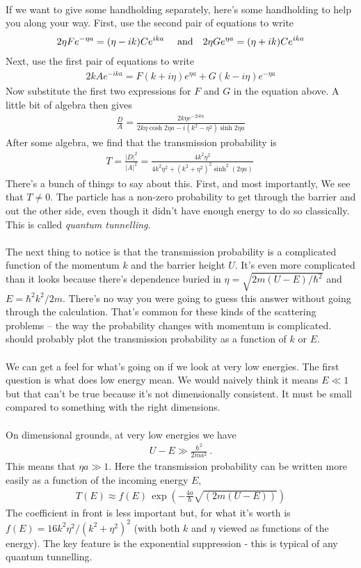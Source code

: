 \documentclass[12pt]{article}
\def\be{\begin{eqnarray}}
\def\ee{\end{eqnarray}}
\newcommand{\nn}{\nonumber}
\newcommand\para{\paragraph{}}
\newcommand{\co}{\color{olive}}
\newcommand{\cblue}{\color{blue}}
\begin{document}
\para
{\cblue If we want to give some handholding separately, here's some handholding to help you along your way. First, use the second pair of equations to write
%
\be 2\eta Fe^{-\eta a} = (\eta-ik)Ce^{ika}\ \ \ \ {\rm and} \ \ \ 2\eta G e^{\eta a} = (\eta+ik)C e^{ika}\nn\ee
%
Next, use the first pair of equations to write
%
\be 2k Ae^{-ika} = F(k+i\eta)e^{\eta a} + G(k-i\eta)e^{-\eta a} \nn\ee
%
Now substitute the first two expressions for $F$ and $G$ in the equation above. A little bit of algebra then gives
%
\be \frac{D}{A} = \frac{2k\eta e^{-2ika}}{2k\eta  \cosh 2\eta a - i(k^2-\eta^2)\sinh 2\eta a}\nn\ee
%
}
After some algebra, we find that the transmission probability is
%
\be T = \frac{|D|^2}{|A|^2} =  \frac{4k^2\eta^2}{4k^2\eta^2  + (k^2+\eta^2)^2\sinh^2(2\eta a)}\ \nn\ee
%
There's a bunch of things to say about this. First, and most importantly,  {\co We see that $T\neq 0$. The particle has a non-zero probability to get through the barrier and out the other side, even though it didn't have enough energy to do so classically. This is called {\it quantum tunnelling}.}

\para
The next thing to notice is that the transmission probability is a complicated function of the momentum $k$ and the barrier height $U$. It's even more complicated than it looks because there's dependence buried in  $\eta= \sqrt{2m(U-E)/\hbar^2}$ and $E=\hbar^2 k^2/2m$. There's no way you were going to guess this answer without going through the calculation. That's common for these kinds of the scattering problems -- the way the probability changes with momentum is complicated. {\cblue should probably plot the transmission probability as a function of $k$ or $E$.}

\para
We can get a feel for what's going on if we look at very low energies. The first question is what does low energy mean. We would naively think it means $E\ll 1$ but that can't be true because it's not dimensionally consistent. It must be small compared to something with the right dimensions.

\para
{\co On dimensional grounds, at very low energies we have
%
\be U-E \gg \frac{\hbar^2}{2ma^2}\ .\ee
%
This means that $\eta a\gg 1$. Here the transmission probability can be written more easily as a function of the incoming energy $E$, 
%
%
\be T(E) \approx f(E)\,\exp\left(-\frac{4a}{\hbar}\sqrt{(2m(U-E))}\right)\ee
%
The coefficient in front is less important but, for what it's worth is $f(E)= 16k^2\eta^2/(k^2+\eta^2)^2$} (with both $k$ and $\eta$ viewed as functions of the energy).  The key feature is the exponential suppression - this is typical of any quantum tunnelling.
\end{document}
